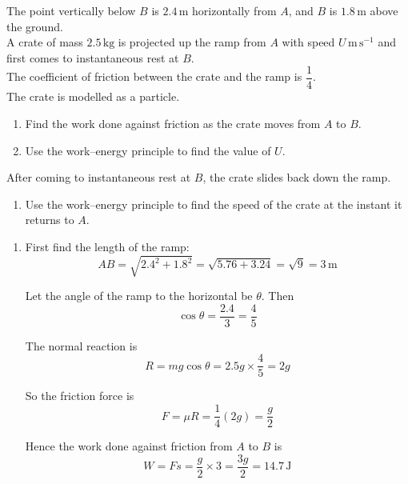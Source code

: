 \documentclass[leqno]{article}
\begin{document}
\begin{enumerate}[
  label=\textbf{\arabic*.},
  leftmargin=*,
  topsep=0pt,
  partopsep=0pt,
  parsep=0pt
]
The point vertically below $B$ is $2.4\,\mathrm{m}$ horizontally from $A$, and $B$ is $1.8\,\mathrm{m}$ above the ground. \\

A crate of mass $2.5\,\mathrm{kg}$ is projected up the ramp from $A$ with speed $U\,\mathrm{m\,s^{-1}}$ and first comes to instantaneous rest at $B$. \\

The coefficient of friction between the crate and the ramp is $\dfrac{1}{4}$. \\

The crate is modelled as a particle. \\

\begin{enumerate}[label=\textbf{(\alph*)}]
  \item Find the work done against friction as the crate moves from $A$ to $B$.  \\
  \item Use the work--energy principle to find the value of $U$.  \\
\end{enumerate}

After coming to instantaneous rest at $B$, the crate slides back down the ramp. \\

\begin{enumerate}[label=\textbf{(\alph*)}, resume]
  \item Use the work--energy principle to find the speed of the crate at the instant it returns to $A$.  \\
\end{enumerate}

\vspace*{10pt}

\begin{djsSolution}
\begin{enumerate}[label=\textbf{(\alph*)}]
  \item First find the length of the ramp:
  \[
  AB=\sqrt{2.4^2+1.8^2}=\sqrt{5.76+3.24}=\sqrt{9}=3\,\mathrm{m}
  \]

  Let the angle of the ramp to the horizontal be \(\theta\). Then
  \[
  \cos\theta=\frac{2.4}{3}=\frac45
  \]

  The normal reaction is
  \[
  R=mg\cos\theta=2.5g\times\frac45=2g
  \]

  So the friction force is
  \[
  F=\mu R=\frac14(2g)=\frac g2
  \]

  Hence the work done against friction from \(A\) to \(B\) is
  \[
  W=Fs=\frac g2\times 3=\frac{3g}{2}=14.7\,\mathrm{J}
  \]


\end{enumerate}
\end{djsSolution}
\end{enumerate}
\end{document}

